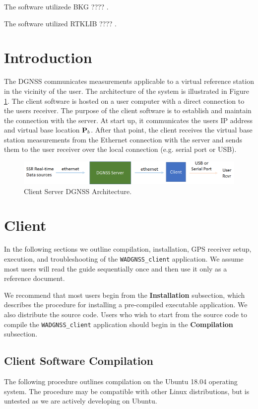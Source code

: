 \noindent
The software utilizede BKG \green ???? \black.

\noindent
The software utilized RTKLIB \green ???? \black.


\newpage
\section{Introduction}
The DGNSS communicates measurements applicable to a virtual reference station in the vicinity of the user. 
The architecture of the system is illustrated in Figure \ref{fig:ClientServer}. 
The client software is hosted on a user computer with a direct connection to the users receiver.  
The purpose of the client software is to establish and maintain the connection with the server.
At start up, it communicates the users IP address and virtual base location $\mathbf{P}_b$.
After that point, the client receives the virtual base station measurements from the Ethernet connection with the server and sends them to the user receiver over the local connection (e.g. serial port or USB).
 

\begin{figure}[H]
	\centering
	\includegraphics[scale=0.5]{./graphics/ClientServer}
	\caption{Client Server DGNSS Architecture. }
	\label{fig:ClientServer}
\end{figure}

\section{Client}
In the following sections we outline compilation, installation, GPS receiver setup, execution, and troubleshooting of the \texttt{WADGNSS\_client} application. 
We assume most users will read the guide sequentially once and then use it only as a reference document.

We recommend that most users begin from the \textbf{Installation} subsection, which describes the procedure for installing a pre-compiled executable application. 
We also distribute the source code.
Users who wish to start from the source code to compile the \texttt{WADGNSS\_client} application should begin in the \textbf{Compilation} subsection. 

\subsection{Client Software Compilation}
The following procedure outlines compilation on the Ubuntu 18.04 operating system. The procedure may be compatible with other Linux distributions, but is untested as we are actively developing on Ubuntu.

